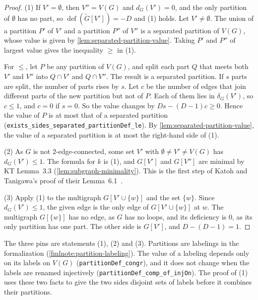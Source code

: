 \begin{proof}
  \leanok
  (1) If $V' = \emptyset$, then $V'' = V(G)$ and $d_G(V') = 0$, and
  the only partition of $\emptyset$ has no part, so
  $\operatorname{def}(\tilde G[V']) = -D$ and (1) holds. Let
  $V' \neq \emptyset$. The union of a partition $P'$ of $V'$ and a
  partition $P''$ of $V''$ is a separated partition of $V(G)$, whose
  value is given by \cref{lem:separated-partition-value}. Taking $P'$ and $P''$ of
  largest value gives the inequality $\ge$ in (1).

  For $\le$, let $P$ be any partition of $V(G)$, and split each part $Q$
  that meets both $V'$ and $V''$ into $Q \cap V'$ and $Q \cap V''$. The
  result is a separated partition. If $s$ parts are split, the number of
  parts rises by $s$. Let $c$ be the number of edges that join different
  parts of the new partition but not of $P$. Each of them lies in
  $\delta_G(V')$, so $c \le 1$, and $c = 0$ if $s = 0$. So the value
  changes by $Ds - (D-1)c \ge 0$. Hence the value of $P$ is at most that
  of a separated partition
  (\texttt{exists\_\allowbreak{}sides\_\allowbreak{}separated\_\allowbreak{}partitionDef\_\allowbreak{}le}).
  By \cref{lem:separated-partition-value}, the value of a separated
  partition is at most the right-hand side of (1).

  (2) As $G$ is not $2$-edge-connected, some set $V'$ with
  $\emptyset \neq V' \neq V(G)$ has $d_G(V') \le 1$. The formula for $k$
  is (1), and $G[V']$ and $G[V'']$ are minimal by KT Lemma~3.3
  (\cref{lem:subgraph-minimality}). This is the first step of
  Katoh and Tanigawa's proof of their
  Lemma~6.1~\cite[p.~672]{katohTanigawa2011}.

  (3) Apply (1) to the multigraph $G[V' \cup \{w\}]$ and the set
  $\{w\}$. Since $d_G(V') \le 1$, the given edge is the only edge of
  $G[V' \cup \{w\}]$ at $w$. The multigraph $G[\{w\}]$ has no edge, as
  $G$ has no loops, and its deficiency is $0$, as its only partition has
  one part. The other side is $G[V']$, and $D - (D-1) = 1$.
\end{proof}
\begin{fmlnote}
  The three pins are statements (1), (2) and (3). Partitions are
  labelings in the formalization (\cref{fmlnote:partition-labeling}).
  The value of a labeling depends only on its labels on $V(G)$
  (\texttt{partitionDef\_\allowbreak{}congr}), and it does not change
  when the labels are renamed injectively
  (\texttt{partitionDef\_\allowbreak{}comp\_\allowbreak{}of\_\allowbreak{}injOn}).
  The proof of (1) uses these two facts to give the two sides disjoint
  sets of labels before it combines their partitions.
\end{fmlnote}

